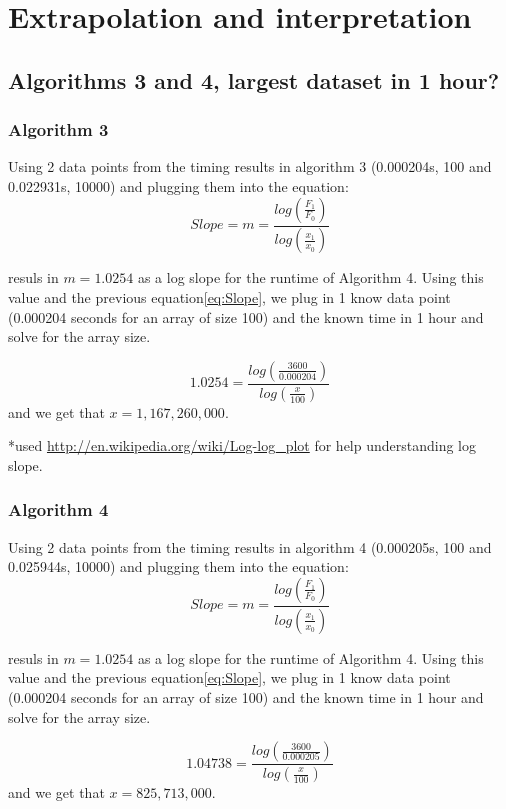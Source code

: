 \documentclass[letterpaper,10pt,titlepage]{article}
\begin{document}
\section{Extrapolation and interpretation}

\subsection{Algorithms 3 and 4, largest dataset in 1 hour?}
\subsubsection{Algorithm 3}
Using 2 data points from the timing results in algorithm 3 (0.000204s, 100 and 0.022931s, 10000) and plugging them into the equation:
\begin{equation}\label{eq:Slope}
Slope = m = \frac{log(\frac{F_{1}}{F_{0}})}{log(\frac{x_{1}}{x_{0}})}
\end{equation}

resuls in $m = 1.0254$ as a log slope for the runtime of Algorithm 4. Using this value and the previous equation\eqref{eq:Slope}, we plug in 1 know data point (0.000204 seconds for an array of size 100) and the known time in 1 hour and solve for the array size.

\begin{equation*}
1.0254 = \frac{log(\frac{3600}{0.000204})}{log(\frac{x}{100})}
\end{equation*}
and we get that $x=1,167,260,000$.

*used \url{http://en.wikipedia.org/wiki/Log-log_plot} for help understanding log slope.
\subsubsection{Algorithm 4}
Using 2 data points from the timing results in algorithm 4 (0.000205s, 100 and 0.025944s, 10000) and plugging them into the equation:
\begin{equation}\label{eq:Slope}
Slope = m = \frac{log(\frac{F_{1}}{F_{0}})}{log(\frac{x_{1}}{x_{0}})}
\end{equation}

resuls in $m = 1.0254$ as a log slope for the runtime of Algorithm 4. Using this value and the previous equation\eqref{eq:Slope}, we plug in 1 know data point (0.000204 seconds for an array of size 100) and the known time in 1 hour and solve for the array size.

\begin{equation*}
1.04738 = \frac{log(\frac{3600}{0.000205})}{log(\frac{x}{100})}
\end{equation*}
and we get that $x=825,713,000$.
\end{document}
